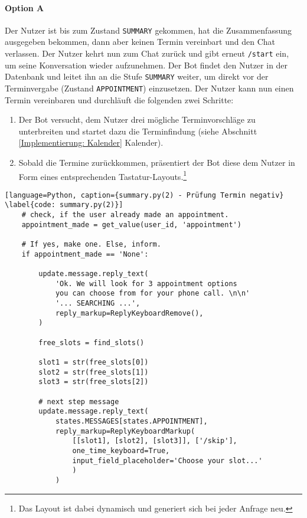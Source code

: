             \paragraph{Option A} Der Nutzer ist bis zum Zustand \verb|SUMMARY| gekommen, hat die Zusammenfassung ausgegeben bekommen, dann aber keinen Termin vereinbart und den Chat verlassen. Der Nutzer kehrt nun zum Chat zurück und gibt erneut \verb|/start| ein, um seine Konversation wieder aufzunehmen. Der Bot findet den Nutzer in der Datenbank und leitet ihn an die Stufe \verb|SUMMARY| weiter, um direkt vor der Terminvergabe (Zustand \verb|APPOINTMENT|) einzusetzen. Der Nutzer kann nun einen Termin vereinbaren und durchläuft die folgenden zwei Schritte: 
                \begin{enumerate}
                    \item Der Bot versucht, dem Nutzer drei mögliche Terminvorschläge zu unterbreiten und startet dazu die Terminfindung (siehe Abschnitt \ref{Implementierung: Kalender} Kalender).
                    \item Sobald die Termine zurückkommen, präsentiert der Bot diese dem Nutzer in Form eines entsprechenden Tastatur-Layouts.\footnote{Das Layout ist dabei dynamisch und generiert sich bei jeder Anfrage neu.}
                \end{enumerate}
            
            \begin{lstlisting}[language=Python, caption={summary.py(2) - Prüfung Termin negativ} \label{code: summary.py(2)}]
    # check, if the user already made an appointment. 
    appointment_made = get_value(user_id, 'appointment')
    
    # If yes, make one. Else, inform.
    if appointment_made == 'None':
        
        update.message.reply_text(
            'Ok. We will look for 3 appointment options 
            you can choose from for your phone call. \n\n'
            '... SEARCHING ...',
            reply_markup=ReplyKeyboardRemove(),
        )

        free_slots = find_slots()

        slot1 = str(free_slots[0])
        slot2 = str(free_slots[1])
        slot3 = str(free_slots[2])

        # next step message
        update.message.reply_text(
            states.MESSAGES[states.APPOINTMENT],
            reply_markup=ReplyKeyboardMarkup(
                [[slot1], [slot2], [slot3]], ['/skip'], 
                one_time_keyboard=True, 
                input_field_placeholder='Choose your slot...'
                )
            )
            \end{lstlisting}
            
